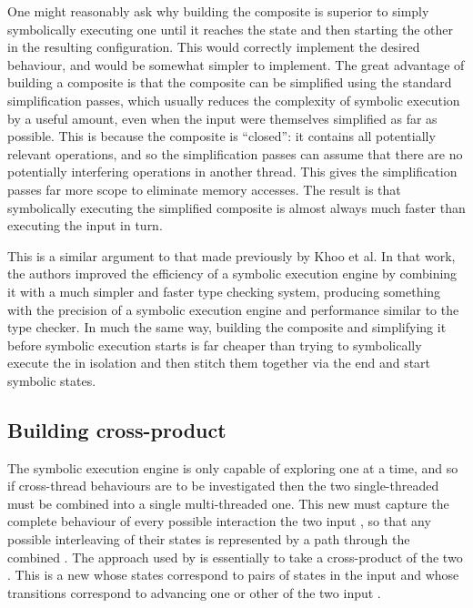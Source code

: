  One might reasonably ask why building the
composite {\StateMachine} is superior to simply symbolically executing
one {\StateMachine} until it reaches the {\stSurvive} state and then
starting the other {\StateMachine} in the resulting configuration.
This would correctly implement the desired behaviour, and would be
somewhat simpler to implement.  The great advantage of building a
composite {\StateMachine} is that the composite {\StateMachine} can be
simplified using the standard {\StateMachine} simplification passes,
which usually reduces the complexity of symbolic execution by a useful
amount, even when the input {\StateMachines} were themselves
simplified as far as possible.  This is because the composite
{\StateMachine} is ``closed'': it contains all potentially relevant
operations, and so the simplification passes can assume that there are
no potentially interfering operations in another thread.  This gives
the simplification passes far more scope to eliminate memory accesses.
The result is that symbolically executing the simplified composite
{\StateMachine} is almost always much faster than executing the input
{\StateMachines} in turn.

This is a similar argument to that made previously by Khoo et
al\cite{Khoo2010}.  In that work, the authors improved the efficiency
of a symbolic execution engine by combining it with a much simpler and
faster type checking system, producing something with the precision of
a symbolic execution engine and performance similar to the type
checker.  In much the same way, building the composite {\StateMachine}
and simplifying it before symbolic execution starts is far cheaper
than trying to symbolically execute the {\StateMachines} in isolation
and then stitch them together via the end and start symbolic states.


\subsection{Building cross-product {\StateMachines}}
\label{sect:using:build_cross_product}

The symbolic execution engine is only capable of exploring one
{\StateMachine} at a time, and so if cross-thread behaviours are to be
investigated then the two single-threaded {\StateMachines} must be
combined into a single multi-threaded one.  This new {\StateMachine}
must capture the complete behaviour of every possible interaction the
two input {\StateMachines}, so that any possible interleaving of their
states is represented by a path through the combined {\StateMachine}.
The approach used by {\technique} is essentially to take a
cross-product of the two {\StateMachines}.  This is a new
{\StateMachine} whose states correspond to pairs of states in the
input {\StateMachine} and whose transitions correspond to advancing
one or other of the two input {\StateMachines}.

